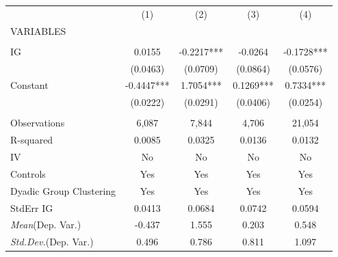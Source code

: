 \documentclass[]{article}
\begin{document}
\begin{tabular}{lcccc} \hline
 & (1) & (2) & (3) & (4) \\
VARIABLES &  &  &  &  \\ \hline
 &  &  &  &  \\
IG & 0.0155 & -0.2217*** & -0.0264 & -0.1728*** \\
 & (0.0463) & (0.0709) & (0.0864) & (0.0576) \\
Constant & -0.4447*** & 1.7054*** & 0.1269*** & 0.7334*** \\
 & (0.0222) & (0.0291) & (0.0406) & (0.0254) \\
 &  &  &  &  \\
Observations & 6,087 & 7,844 & 4,706 & 21,054 \\
R-squared & 0.0085 & 0.0325 & 0.0136 & 0.0132 \\
IV & No & No & No & No \\
Controls & Yes & Yes & Yes & Yes \\
Dyadic Group Clustering & Yes & Yes & Yes & Yes \\
StdErr IG & 0.0413 & 0.0684 & 0.0742 & 0.0594 \\
\textit{Mean}(Dep. Var.) & -0.437 & 1.555 & 0.203 & 0.548 \\
 \textit{Std.Dev.}(Dep. Var.) & 0.496 & 0.786 & 0.811 & 1.097 \\ \hline
\end{tabular}
\end{document}
